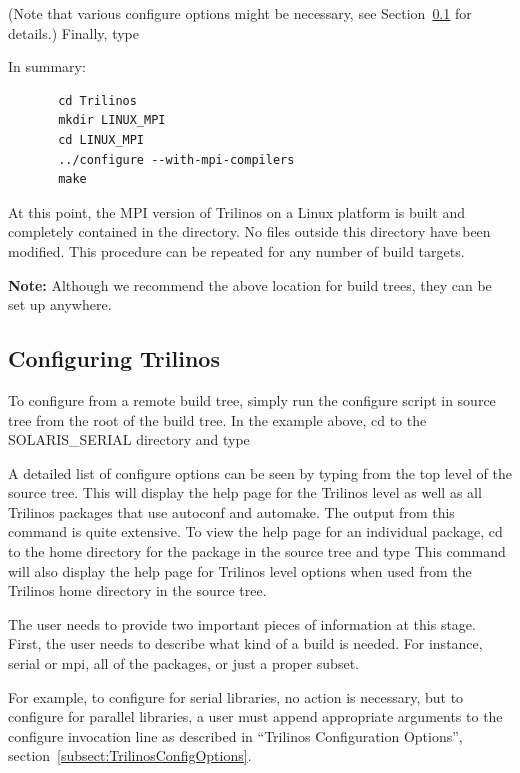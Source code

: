 \documentclass[12pt,relax]{TrilinosDevGuide}
\begin{document}

(Note that various configure options might be necessary, see Section~\ref{Subsection:ConfiguringTrilinos} for details.)  Finally, type



In summary:

\begin{verbatim}
       cd Trilinos
       mkdir LINUX_MPI
       cd LINUX_MPI
       ../configure --with-mpi-compilers
       make
\end{verbatim}
At this point, the MPI version of Trilinos on a Linux platform is
built and completely contained in the 
directory.  No files outside this directory have been modified.  This
procedure can be repeated for any number of build targets.

{\bf Note:} Although we recommend the above location for build trees,
they can be set up anywhere.

\subsection{Configuring Trilinos}
\label{Subsection:ConfiguringTrilinos}
	To configure from a remote build tree, simply run the configure script 
in source tree from the root of the build tree.  In the example above, cd to 
the SOLARIS\_SERIAL directory and type 

A detailed list of configure options can be seen by typing
 from the top level of the 
source tree.  This will display the help page for the Trilinos level as well as all 
Trilinos packages that use autoconf and automake.  The output from this command
is quite extensive.  To view the help page for an individual package, cd to 
the home directory for the package in the source tree and type 
This command will also display the help page for Trilinos level 
options when used from the Trilinos home directory in the source tree.


	The user needs to provide two important pieces of information at this 
stage.  First, the user needs to describe what kind of a build is needed.  For 
instance, serial or mpi, all of the packages, or just a proper subset.  

	For example, to configure for serial libraries, no action is necessary,
but to configure for parallel libraries, a user must append appropriate 
arguments to the configure invocation line as described in ``Trilinos 
Configuration Options'', section~\ref{subsect:TrilinosConfigOptions}.
\end{document}
